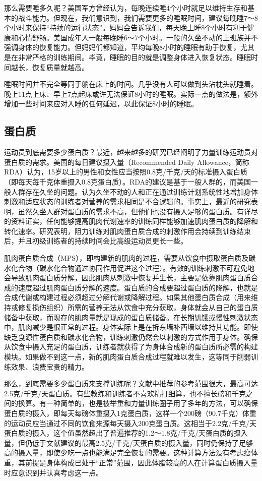 那么需要睡多久呢？美国军方曾经认为，每晚连续睡4个小时就足以维持生存和基本的战斗能力。但现在，我们意识到，我们需要更多的睡眠时间，建议每晚睡7～8个小时来保持“持续的运行状态”。妈妈会告诉我们，每天晚上睡8个小时有利于健康和心情舒畅。美国成年人一般每晚睡6～7个小时。一般的久坐不动的上班族并不强调身体的恢复能力。但妈妈们都知道，平均每晚8小时的睡眠有助于恢复，尤其是在非常严格的训练期间。毕竟，睡眠的目的就是调整身体进入恢复状态。睡眠时间越长，恢复质量就越高。

睡眠时间并不完全等同于躺在床上的时间。几乎没有人可以做到头沾枕头就睡着。晚上11点上床、早上7点起床或许无法保证8小时的睡眠。实际一点的做法是，额外增加一些时间来应对入睡的任何延迟，以此保证8小时的睡眠。

\subsection{蛋白质}

运动员到底需要多少蛋白质？最近，越来越多的研究已经阐明了力量训练运动员对蛋白质的需求。美国的每日建议摄入量（Recommended Daily Allowance，简称RDA）认为，15岁以上的男性和女性应当按照0.8克/千克/天的标准摄入蛋白质（即每天每千克体重摄入0.8克蛋白质）。RDA的建议是基于一般人群的，而美国一般人群存在久坐的问题。认为久坐不动的人和正在通过训练计划系统性地增加身体刺激和适应状态的训练者对营养的需求相同是不合逻辑的。事实上，最近的研究表明，虽然久坐人群对蛋白质的需求不高，但他们也没有摄入足够的蛋白质。有详尽的资料证实，任何能够提高肌肉代谢速率的训练同样能够加速肌肉蛋白质的降解和转化速率。研究表明，阻力训练对肌肉蛋白质合成的刺激作用会持续到训练结束后，并且初级训练者的持续时间会比高级运动员更长一些。

肌肉蛋白质合成（MPS），即构建新的肌肉的过程，需要从饮食中摄取蛋白质及碳水化合物（碳水化合物通过协同作用促进这个过程）。有效的训练刺激不可避免地会导致肌肉蛋白质分解，因此肌肉从刺激中恢复并生长，主要是依靠肌肉蛋白质合成的速度超过肌肉蛋白质分解的速度。蛋白质的合成要超过蛋白质的降解，也就是合成代谢或构建过程必须超过分解代谢或降解过程。如果其他蛋白质合成（用来维持或修复损伤组织）所需的营养无法从饮食中充分获取，身体就会从自己的蛋白质储备中获取，而现存的肌肉量就是现成的蛋白质储备。在长期饥饿或慢性刺激状态中，肌肉减少是很正常的过程。身体实际上是在拆东墙补西墙以维持其功能。即使缺乏食源性蛋白质和碳水化合物，训练刺激仍然会以刺激的方式作用于身体。确保从饮食中摄入充足的蛋白质，训练者就获得了为身体合成新的蛋白质所必需的构建模块。如果做不到这一点，新的肌肉蛋白质合成过程就难以发生，这等同于削弱训练效果、浪费宝贵的精力。

那么，到底需要多少蛋白质来支撑训练呢？文献中推荐的参考范围很大，最高可达2.5克/千克/天蛋白质。有些教练和训练者不喜欢精打细算，也不擅长磅和千克之间的换算。有一种简单的，也是被举重和力量训练圈子用了多年的方法，可以确保蛋白质的摄入，即每天每磅体重摄入1克蛋白质，这样一个200磅（90.7千克）体重的运动员应当通过不同的饮食来源每天摄入200克蛋白质。这相当于2.2克/千克/天蛋白质的摄入，这个值虽然超出了普遍推荐的1.2～1.8克/千克/天蛋白质的摄入量，但仍低于文献建议的最高2.5克/千克/天蛋白质的摄入量，同时仍保持了足够高的摄入量，即使少吃一点也能满足完全恢复的需要。这种计算方法没有考虑瘦体重，其前提是身体构成已处于“正常”范围，因此体脂较高的人在计算蛋白质摄入量时应意识到并认真考虑这一点。

